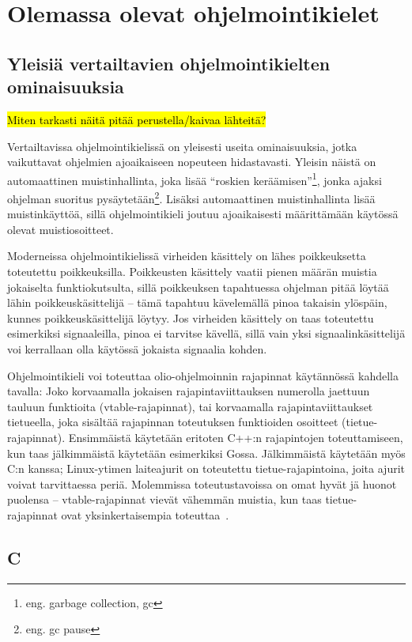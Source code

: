 \section{Olemassa olevat ohjelmointikielet}

\subsection{Yleisiä vertailtavien ohjelmointikielten ominaisuuksia}

\hl{Miten tarkasti näitä pitää perustella/kaivaa lähteitä?}

Vertailtavissa ohjelmointikielissä on yleisesti useita ominaisuuksia, jotka
vaikuttavat ohjelmien ajoaikaiseen nopeuteen hidastavasti. Yleisin näistä on
automaattinen muistinhallinta, joka lisää ``roskien keräämisen''\footnote{eng.
garbage collection, gc}, jonka ajaksi ohjelman suoritus
pysäytetään\footnote{eng. gc pause}. Lisäksi automaattinen muistinhallinta
lisää muistinkäyttöä, sillä ohjelmointikieli joutuu ajoaikaisesti määrittämään
käytössä olevat muistiosoitteet.

Moderneissa ohjelmointikielissä virheiden käsittely on lähes poikkeuksetta
toteutettu poikkeuksilla. Poikkeusten käsittely vaatii pienen määrän muistia
jokaiselta funktiokutsulta, sillä poikkeuksen tapahtuessa ohjelman pitää löytää
lähin poikkeuskäsittelijä -- tämä tapahtuu kävelemällä pinoa takaisin ylöspäin,
kunnes poikkeuskäsittelijä löytyy. Jos virheiden käsittely on taas toteutettu
esimerkiksi signaaleilla, pinoa ei tarvitse kävellä, sillä vain yksi
signaalinkäsittelijä voi kerrallaan olla käytössä jokaista signaalia kohden.

Ohjelmointikieli voi toteuttaa olio-ohjelmoinnin rajapinnat käytännössä kahdella
tavalla: Joko korvaamalla jokaisen rajapintaviittauksen numerolla jaettuun
tauluun funktioita (vtable-rajapinnat), tai korvaamalla rajapintaviittaukset
tietueella, joka sisältää rajapinnan toteutuksen funktioiden osoitteet
(tietue-rajapinnat).  Ensimmäistä käytetään eritoten C++:n rajapintojen
toteuttamiseen, kun taas jälkimmäistä käytetään esimerkiksi Gossa.
Jälkimmäistä käytetään myös C:n kanssa; Linux-ytimen laiteajurit on toteutettu
tietue-rajapintoina, joita ajurit voivat tarvittaessa periä. Molemmissa
toteutustavoissa on omat hyvät jä huonot puolensa -- vtable-rajapinnat vievät
vähemmän muistia, kun taas tietue-rajapinnat ovat yksinkertaisempia
toteuttaa~\citationneeded.

\subsection{C}

